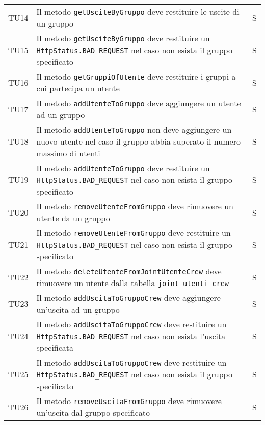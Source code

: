 \begin{center}
{\begin{longtable}{
        |>{\centering\arraybackslash}p{48pt}
        |>{\centering\arraybackslash}p{308pt}
        |>{\centering\arraybackslash}p{27pt}|}
        TU14                                & Il metodo \texttt{getUsciteByGruppo} deve restituire le uscite di un gruppo & S \\
        TU15                                & Il metodo \texttt{getUsciteByGruppo} deve restituire un \texttt{ HttpStatus.BAD\_REQUEST} nel caso non esista il gruppo specificato   & S \\
        TU16                                & Il metodo \texttt{getGruppiOfUtente} deve restituire i gruppi a cui partecipa un utente   & S \\
        TU17                                & Il metodo \texttt{addUtenteToGruppo} deve aggiungere un utente ad un gruppo   & S \\
        TU18                                & Il metodo \texttt{addUtenteToGruppo} non deve aggiungere un nuovo utente nel caso il gruppo abbia superato il numero massimo di utenti    & S \\
        TU19                                & Il metodo \texttt{addUtenteToGruppo} deve restituire un \texttt{ HttpStatus.BAD\_REQUEST} nel caso non esista il gruppo specificato     & S \\
        TU20                                & Il metodo \texttt{removeUtenteFromGruppo} deve rimuovere un utente da un gruppo    & S \\
        TU21                                & Il metodo \texttt{removeUtenteFromGruppo} deve restituire un \texttt{ HttpStatus.BAD\_REQUEST} nel caso non esista il gruppo specificato   & S \\
        TU22                                & Il metodo \texttt{deleteUtenteFromJointUtenteCrew} deve rimuovere un utente dalla tabella \texttt{joint\_utenti\_crew}    & S \\
        TU23                                & Il metodo \texttt{addUscitaToGruppoCrew} deve aggiungere un'uscita ad un gruppo    & S \\
        TU24                                & Il metodo \texttt{addUscitaToGruppoCrew}  deve restituire un \texttt{HttpStatus.BAD\_REQUEST} nel caso non esista l'uscita specificata    & S \\
        TU25                                & Il metodo \texttt{addUscitaToGruppoCrew} deve restituire un \texttt{HttpStatus.BAD\_REQUEST} nel caso non esista il gruppo specificato    & S \\
        TU26                                & Il metodo \texttt{removeUscitaFromGruppo} deve rimuovere un'uscita dal gruppo specificato    & S \\

\end{longtable}}
\end{center}
